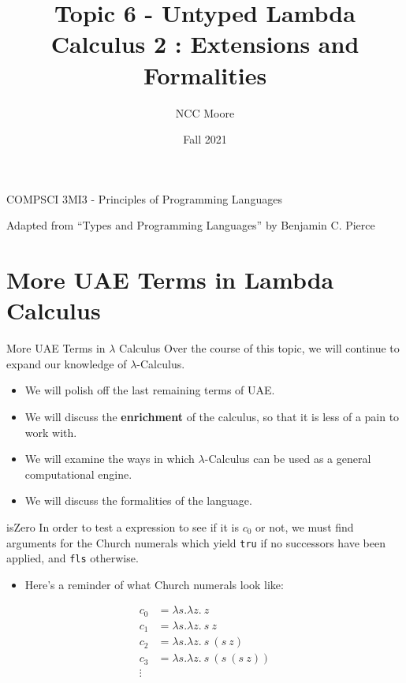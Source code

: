 \documentclass[11pt]{beamer}
\author{NCC Moore}
\title{Topic 6 - Untyped Lambda Calculus 2 : Extensions and Formalities}
\institute{McMaster University}
\date{Fall 2021}
\begin{document}
\begin{frame}
\center
COMPSCI 3MI3 - Principles of Programming Languages
\titlepage

Adapted from ``Types and Programming Languages'' by Benjamin C. Pierce 
\end{frame}

\begin{frame}
\tableofcontents
\end{frame}

\section[UAE Terms]{More UAE Terms in Lambda Calculus}
\begin{frame}[fragile=singleslide]{More UAE Terms in $\lambda$ Calculus}
Over the course of this topic, we will continue to expand our knowledge of $\lambda$-Calculus.
\begin{itemize}
\item We will polish off the last remaining terms of UAE.
\item We will discuss the \textbf{enrichment} of the calculus, so that it is less of a pain to work with.
\item We will examine the ways in which $\lambda$-Calculus can be used as a general computational engine.  
\item We will discuss the formalities of the language.
\end{itemize}
\end{frame}

\begin{frame}[fragile=singleslide]{isZero}
In order to test a expression to see if it is $c_0$ or not, we must find arguments for the Church numerals which yield \texttt{tru} if no successors have been applied, and \texttt{fls} otherwise.
\begin{itemize}
\item Here's a reminder of what Church numerals look like:
\end{itemize}

\begin{align}
c_0 &= \lambda s. \lambda z.\:z \\
c_1 &= \lambda s. \lambda z.\:s\:z \\
c_2 &= \lambda s. \lambda z.\:s\:(s\:z) \\
c_3 &= \lambda s. \lambda z.\:s\:(s\:(s\:z)) \\
\vdots \nonumber
\end{align}

\end{frame}
\end{document}
